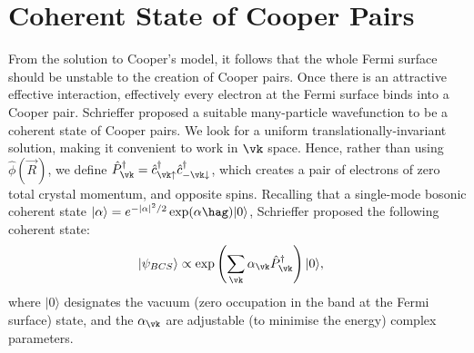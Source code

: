 \documentclass[a4paper, 11pt, normalem]{report}
\begin{document}
\section{Coherent State of Cooper Pairs}
From the solution to Cooper's model, it follows that the whole Fermi surface should be unstable to the creation of Cooper pairs.
Once there is an attractive effective interaction, effectively every electron at the Fermi surface binds into a Cooper pair.
Schrieffer proposed a suitable many-particle wavefunction to be a coherent state of Cooper pairs.
We look for a uniform translationally-invariant solution, making it convenient to work in $\vk$ space.
Hence, rather than using $\hat{\phi}(\vec{R})$, we define $\hat{P}_{\vk}^\dagger=\hat{c}^\dagger_{\vk\uparrow}\hat{c}^\dagger_{-\vk\downarrow}$, which creates a pair of electrons of zero total crystal momentum, and opposite spins.
Recalling that a single-mode bosonic coherent state $|\alpha\rangle=e^{-|\alpha|^2/2}\exp(\alpha\hag)|0\rangle$, Schrieffer proposed the following coherent state:
\begin{align}
    |\psi_{BCS}\rangle &\propto \exp\left(\sum_{\vk}\alpha_{\vk}\hat{P}_{\vk}^\dagger\right)|0\rangle,
\end{align}
where $|0\rangle$ designates the vacuum (zero occupation in the band at the Fermi surface) state, and the $\alpha_{\vk}$ are adjustable (to minimise the energy) complex parameters.
\end{document}
